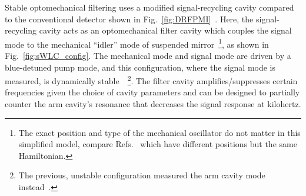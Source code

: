 Stable optomechanical filtering uses a modified signal-recycling cavity compared to the conventional detector shown in Fig.~\ref{fig:DRFPMI}~\cite{liBroadbandSensitivityImprovement2020}. Here, the signal-recycling cavity acts as an optomechanical filter cavity which couples the signal mode to the mechanical ``idler'' mode of suspended mirror~\footnote{The exact position and type of the mechanical oscillator do not matter in this simplified model, compare Refs.~\cite{liBroadbandSensitivityImprovement2020,liEnhancingInterferometerSensitivity2021} which have different positions but the same Hamiltonian.}, as shown in Fig.~\ref{fig:sWLC_config}. The mechanical mode and signal mode are driven by a blue-detuned pump mode, and this configuration, where the signal mode is measured, is dynamically stable~\cite{liBroadbandSensitivityImprovement2020}~\footnote{The previous, unstable configuration measured the arm cavity mode instead~\cite{miaoEnhancingBandwidthGravitationalWave2015}.}.
The filter cavity amplifies/suppresses certain frequencies given the choice of cavity parameters and can be designed to partially counter the arm cavity's resonance that decreases the signal response at kilohertz. %
